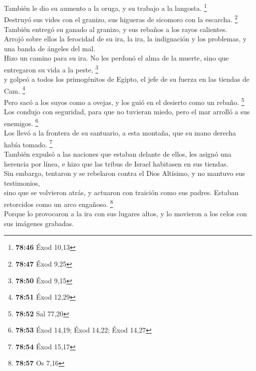  También le dio su aumento a la oruga, y su trabajo a la
langosta. \footnote{\textbf{78:46} Éxod 10,13}\\
 Destruyó sus vides con el granizo, sus higueras de
sicomoro con la escarcha. \footnote{\textbf{78:47} Éxod 9,25}\\
 También entregó su ganado al granizo, y sus rebaños a
los rayos calientes.\\
 Arrojó sobre ellos la ferocidad de su ira, la ira, la
indignación y los problemas, y una banda de ángeles del mal.\\
 Hizo un camino para su ira. No les perdonó el alma de la
muerte, sino que entregaron su vida a la peste, \footnote{\textbf{78:50}
  Éxod 9,15}\\
 y golpeó a todos los primogénitos de Egipto, el jefe de
su fuerza en las tiendas de Cam. \footnote{\textbf{78:51} Éxod 12,29}\\
 Pero sacó a los suyos como a ovejas, y los guió en el
desierto como un rebaño. \footnote{\textbf{78:52} Sal 77,20}\\
 Los condujo con seguridad, para que no tuvieran miedo,
pero el mar arrolló a sus enemigos. \footnote{\textbf{78:53} Éxod 14,19;
  Éxod 14,22; Éxod 14,27}\\
 Los llevó a la frontera de su santuario, a esta montaña,
que su mano derecha había tomado. \footnote{\textbf{78:54} Éxod 15,17}\\
 También expulsó a las naciones que estaban delante de
ellos, les asignó una herencia por línea, e hizo que las tribus de
Israel habitasen en sus tiendas.\\
 Sin embargo, tentaron y se rebelaron contra el Dios
Altísimo, y no mantuvo sus testimonios,\\
 sino que se volvieron atrás, y actuaron con traición
como sus padres. Estaban retorcidos como un arco engañoso. \footnote{\textbf{78:57}
  Os 7,16}\\
 Porque lo provocaron a la ira con sus lugares altos, y
lo movieron a los celos con sus imágenes grabadas.
